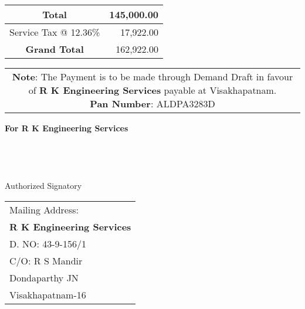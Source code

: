 \documentclass[11pt]{article}
\begin{document}
\vspace*{10pt}

\hspace*{11.8cm}
\begin{tabular}{|c|r|}
\hline
Total & 145,000.00 \\
\hline
Service Tax @ 12.36\% & 17,922.00 \\
\hline
{\bf Grand Total} & 162,922.00 \\
\hline
\end{tabular}

\vspace*{-1.2cm}
\noindent\begin{tabular}{c}
\parbox{4in}{ {\bf Note}: The Payment is to be made through Demand Draft in favour of {\bf R K Engineering Services} payable at Visakhapatnam. \\
{\noindent \bf Pan Number}:  ALDPA3283D }\\
\end{tabular}
\vspace*{100pt}


{\bf For  R K Engineering Services } \\ \\ \\ \\ \\
 \hspace*{0.6cm}Authorized Signatory
\vspace*{-71pt}
\begin{flushright}
\begin{tabular}{l}
Mailing Address:\\
{\bf R K Engineering Services}\\
D. NO: 43-9-156/1\\
C/O: R S Mandir\\
Dondaparthy JN\\ 
Visakhapatnam-16\\
\end{tabular}
\end{flushright}
\end{document}
